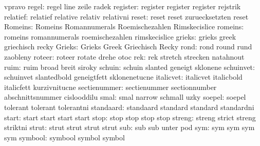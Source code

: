                       vpravo
              regel:  regel                line                zeile
                      radek
           register:  register             register            register
                      rejstrik
           relatief:  relatief             relative            relativ
                      relativni
              reset:  reset                reset               zuruecksetzten
                      reset
            Romeins:  Romeins              Romannumerals       Roemischezahlen
                      Rimskecislice
            romeins:  romeins              romannumerals       roemischezahlen
                      rimskecislice
             grieks:  grieks               greek               griechisch
                      recky
             Grieks:  Grieks               Greek               Griechisch
                      Recky
               rond:  rond                 round               rund
                      zaobleny
             roteer:  roteer               rotate              drehe
                      otoc
                rek:  rek                  stretch             strecken
                      natahnout
               ruim:  ruim                 broad               breit
                      siroky
             schuin:  schuin               slanted             geneigt
                      sklonene
          schuinvet:  schuinvet            slantedbold         geneigtfett
                      sklonenetucne
          italicvet:  italicvet            italicbold          italicfett
                      kurzivnitucne
       sectienummer:  sectienummer         sectionnumber       abschnittsnummer
                      cislooddilu
               smal:  smal                 narrow              schmall
                      uzky
             soepel:  soepel               tolerant            tolerant
                      tolerantni
          standaard:  standaard            standard            standard
                      standardni
              start:  start                start               start
                      start
               stop:  stop                 stop                stop
                      stop
             streng:  streng               strict              streng
                      striktni
              strut:  strut                strut               strut
                      strut 
                sub:  sub                  sub                 unter
                      pod
                sym:  sym                  sym                 sym
                      sym
            symbool:  symbool              symbol              symbol
